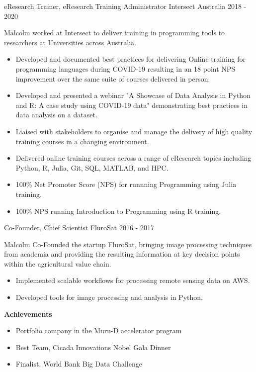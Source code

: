 \begin{cventries}
\cventry
    {eResearch Trainer, eResearch Training Administrator} %
    {Intersect Australia} %
    {} %
    {2018 - 2020} %
{%
  Malcolm worked at Intersect to deliver training in programming tools
  to researchers at Universities across Australia.
  \begin{itemize}
    \item Developed and documented best practices for delivering Online
      training for programming languages during COVID-19 resulting in an
      18 point NPS improvement over the same suite of courses delivered in person.
    \item Developed and presented a webinar
      {"A Showcase of Data Analysis in Python and R: A case study using COVID-19 data"}
      demonstrating best practices in data analysis on a dataset.
    \item Liaised with stakeholders to organise and manage the delivery of high
      quality training courses in a changing environment.
    \item Delivered online training courses across a range of eResearch topics
      including Python, R, Julia, Git, SQL, MATLAB, and HPC.
    \item 100\% Net Promoter Score (NPS) for runnning Programming using Julia training.
    \item 100\% NPS running Introduction to Programming using R training.
  \end{itemize}
}

\cventry
    {Co-Founder, Chief Scientist} %
    {FluroSat} %
    {} %
    {2016 - 2017} %
{%
  Malcolm Co-Founded the startup FluroSat, 
  bringing image processing techniques from academia
  and providing the resulting information at key decision points
  within the agricultural value chain.
  \begin{itemize}
    \item Implemented scalable workflows for processing remote sensing data on AWS.
    \item Developed tools for image processing and analysis in Python.
    \end{itemize}
  \textbf{Achievements}
  \begin{itemize}
      \item Portfolio company in the Muru-D accelerator program
      \item Best Team, Cicada Innovations Nobel Gala Dinner
      \item Finalist, World Bank Big Data Challenge
  \end{itemize}
}

\end{cventries}
